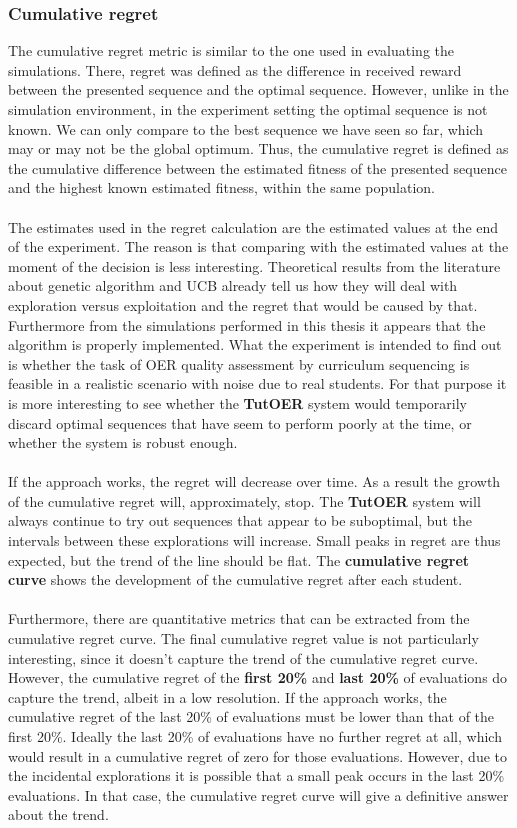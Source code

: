 \subsubsection{Cumulative regret}
The cumulative regret metric is similar to the one used in evaluating the
simulations. There, regret was defined as the difference in received reward
between the presented sequence and the optimal sequence. However, unlike in the
simulation environment, in the experiment setting the optimal sequence is not
known. We can only compare to the best sequence we have seen so far, which may
or may not be the global optimum. Thus, the cumulative regret is defined as the
cumulative difference between the estimated fitness of the presented sequence
and the highest known estimated fitness, within the same population.\\\\
\noindent
The estimates used in the regret calculation are the estimated values at the
end of the experiment. The reason is that comparing with the estimated values
at the moment of the decision is less interesting. Theoretical results from the
literature about genetic algorithm and UCB already tell us how they will deal
with exploration versus exploitation and the regret that would be caused by
that. Furthermore from the simulations performed in this thesis it appears that
the algorithm is properly implemented. What the experiment is intended to find
out is whether the task of OER quality assessment by curriculum sequencing is
feasible in a realistic scenario with noise due to real students. For that
purpose it is more interesting to see whether the \textbf{TutOER} system would
temporarily discard optimal sequences that have seem to perform poorly at the
time, or whether the system is robust enough.\\\\
\noindent
If the approach works, the regret will decrease over time. As a result the
growth of the cumulative regret will, approximately, stop. The \textbf{TutOER}
system will always continue to try out sequences that appear to be suboptimal,
but the intervals between these explorations will increase. Small peaks in
regret are thus expected, but the trend of the line should be flat. The
\textbf{cumulative regret curve} shows the development of the cumulative regret
after each student.\\\\
\noindent
Furthermore, there are quantitative metrics that can be extracted from
the cumulative regret curve. The final cumulative regret value is not
particularly interesting, since it doesn't capture the trend of the cumulative
regret curve. However, the cumulative regret of the \textbf{first 20\%} and
\textbf{last 20\%} of evaluations do capture the trend, albeit in a low
resolution. If the approach works, the cumulative regret of the last 20\% of
evaluations must be lower than that of the first 20\%. Ideally the last 20\% of
evaluations have no further regret at all, which would result in a cumulative
regret of zero for those evaluations. However, due to the incidental
explorations it is possible that a small peak occurs in the last 20\%
evaluations. In that case, the cumulative regret curve will give a definitive
answer about the trend.
